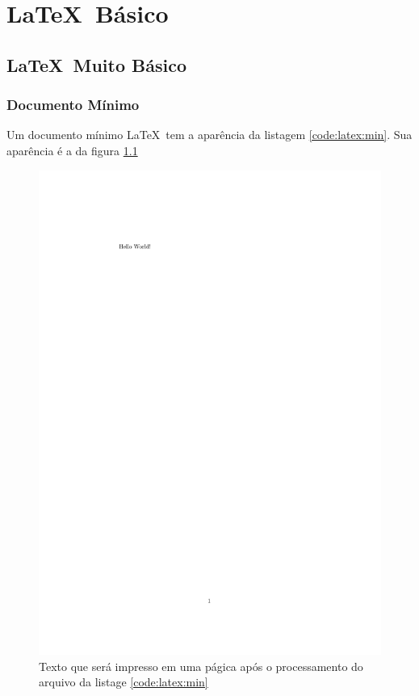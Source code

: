 \chapter{\LaTeX\ Básico}

\section{\LaTeX\ Muito Básico}

\subsection{Documento Mínimo}

Um documento mínimo \LaTeX\ tem a aparência da listagem \ref{code:latex:min}. Sua aparência é a da figura
\ref{fig:pdf:min}







\begin{figure}
        \centering
        \includegraphics[clip,trim= 4.8cm 24.5cm 14cm 4.3cm ]{minimo.pdf}
\caption{Texto que será impresso em uma págica após o processamento do arquivo da listage \ref{code:latex:min}}
\label{fig:pdf:min}

\end{figure}

